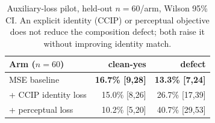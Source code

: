 \begin{table}[t]
\centering\small
\begin{tabular}{@{}lrr@{}}
\toprule
Arm ($n{=}60$) & clean-yes & defect \\
\midrule
MSE baseline & \textbf{16.7\% [9,28]} & \textbf{13.3\% [7,24]} \\
+ CCIP identity loss & 15.0\% [8,26] & 26.7\% [17,39] \\
+ perceptual loss & 10.2\% [5,20] & 40.7\% [29,53] \\
\bottomrule
\end{tabular}
\caption{Auxiliary-loss pilot, held-out $n{=}60$/arm, Wilson 95\% CI. An
explicit identity (CCIP) or perceptual objective does not reduce the
composition defect; both raise it without improving identity match.}
\label{tab:auxloss}
\end{table}
